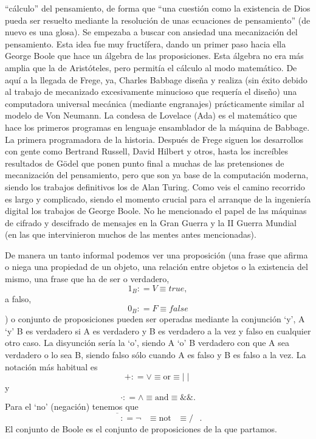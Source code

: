   ``cálculo'' del pensamiento, de forma que ``una cuestión como la
  existencia de Dios pueda ser resuelto mediante la resolución de unas
  ecuaciones de pensamiento'' (de nuevo es una glosa). Se empezaba a
  buscar con ansiedad una mecanización del pensamiento. Esta idea fue
  muy fructífera, dando un primer paso hacia ella George Boole que hace
  un ál\-gebra de las proposiciones. Esta álgebra no era más amplia que
  la de Aristóteles, pero permitía el cálculo al modo matemático. De
  aquí a la llegada de Frege, ya, Charles Babbage diseña y realiza (sin
  éxito debido al trabajo de mecanizado ex\-cesivamente minucioso que
  requería el diseño) una computadora universal me\-cánica (mediante
  engranajes) prácticamente similar al modelo de Von Neumann. La condesa
  de Lovelace (Ada) es el matemático que hace los primeros progra\-mas
  en lenguaje ensamblador de la máquina de Babbage. La primera
  programa\-dora de la historia. Después de Frege siguen los desarrollos
  con gente como Ber\-trand Russell, David Hilbert y otros, hasta los
  increíbles resultados de Gödel que ponen punto final a muchas de las
  pretensiones de mecanización del pensamiento, pero que son ya base de
  la computación moderna, siendo los trabajos definitivos los de Alan
  Turing. Como veis el camino recorrido es largo y complicado, siendo el
  momento crucial para el arranque de la ingeniería digital los trabajos
  de George Boole. No he mencionado el papel de las máquinas de cifrado
  y descifrado de mensajes en la Gran Guerra y la II Guerra Mundial (en
  las que intervinieron muchos de las mentes antes mencionadas).

  De manera un tanto informal podemos ver una proposición (una frase que
  afirma o niega una propiedad de un objeto, una relación entre objetos
  o la existencia del mismo, una frase que ha de ser o verdadero,
  \[1_{B}{{: = V} \equiv \mathbf{\mathit{true}}} , \] a falso,
  \[0_{B}{{: = F} \equiv \mathbf{\mathit{false}}}\]) o conjunto de
  proposiciones pueden ser operadas mediante la conjunción `y', A `y' B
  es verdadero si A es verdadero y B es verdadero a la vez y falso en
  cualquier otro caso. La disyunción sería la `o', siendo A `o' B
  verdadero con que A sea verdadero o lo sea B, siendo falso sólo cuando
  A es falso y B es falso a la vez. La notación más habitual es
  \[{{+ {: = \vee}} \equiv \text{or}} \equiv {\mid \mid}\]y\[{{\cdot {: = \land}} \equiv \text{and}} \equiv {\&\&} . \]
  Para el `no' (negación) tenemos
  que\[{{\overline{\phantom{A}}{: = {\neg\phantom{A}}}} \equiv \text{not}}{\phantom{A} \equiv {/\phantom{A}}} . \]
  El conjunto de Boole es el conjunto de proposiciones de la que
  partamos.

